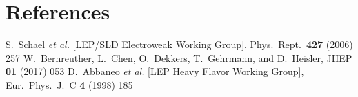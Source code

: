 \documentclass{moriond}
\begin{document}

\section*{References}

\begin{thebibliography}{99}

S.~Schael {\it et al.} [LEP/SLD Electroweak Working Group], Phys.\ Rept.\  {\bf 427} (2006) 257
W.~Bernreuther, L.~Chen, O.~Dekkers, T.~Gehrmann, and D.~Heisler, JHEP {\bf 01} (2017) 053
D.~Abbaneo {\it et al.} [LEP Heavy Flavor Working Group], Eur.\ Phys.\ J.\ C {\bf 4} (1998) 185


\end{thebibliography}
\end{document}
